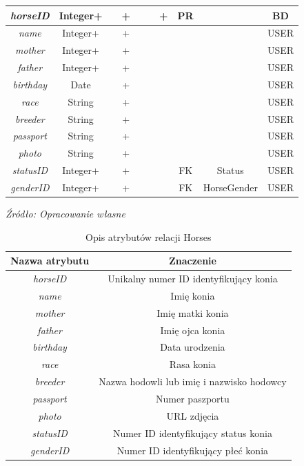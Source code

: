 \documentclass[12pt,twoside]{report}
\begin{document}
\begin{enumerate}[start=1,label={\bfseries REL\textbackslash0\arabic*}]
\begin{table}[H]
\begin{tabular}{|c|c|c|c|c|c|c|c|c|c|}
		\hline
		\textit{horseID}&Integer+&&+&&&+&PR&&BD\\		
		\hline			
		\textit{name}&Integer+&&+&&&&&&USER\\		
		\hline			
		\textit{mother}&Integer+&&+&&&&&&USER\\		
		\hline			
		\textit{father}&Integer+&&+&&&&&&USER\\		
		\hline			
		\textit{birthday}&Date&&+&&&&&&USER\\		
		\hline			
		\textit{race}&String&&+&&&&&&USER\\		
		\hline			
		\textit{breeder}&String&&+&&&&&&USER\\		
		\hline			
		\textit{passport}&String&&+&&&&&&USER\\		
		\hline			
		\textit{photo}&String&&+&&&&&&USER\\		
		\hline		
		\textit{statusID}&Integer+&&+&&&&FK&Status&USER\\		
		\hline
		\textit{genderID}&Integer+&&+&&&&FK&HorseGender&USER\\		
		\hline
	\end{tabular}
\end{table}

\begin{table}[H]
	\caption{Opis atrybutów relacji Horses}
	\textit{Źródło: Opracowanie własne}
	\label{HorsesAttributeDescription}
	\centering
	\begin{tabular}{|c|c|}
		\hline
		Nazwa atrybutu & Znaczenie \\
		\hline
		\textit{horseID}&Unikalny numer ID identyfikujący konia\\		
		\hline			
		\textit{name}& Imię konia\\		
		\hline			
		\textit{mother}& Imię matki konia\\		
		\hline			
		\textit{father}& Imię ojca konia\\		
		\hline			
		\textit{birthday}& Data urodzenia\\		
		\hline			
		\textit{race}& Rasa konia\\		
		\hline			
		\textit{breeder}& Nazwa hodowli lub imię i nazwisko hodowcy\\		
		\hline			
		\textit{passport}& Numer paszportu\\		
		\hline			
		\textit{photo}& URL zdjęcia\\		
		\hline		
		\textit{statusID}& Numer ID identyfikujący status konia\\		
		\hline
		\textit{genderID}&Numer ID identyfikujący płeć konia\\		
		\hline
	\end{tabular}
\end{table}
\end{enumerate}
\end{document}
